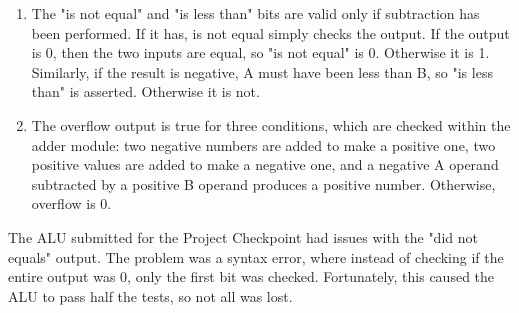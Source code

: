 \documentclass[letterpaper]{article} %
\begin{document}
\begin{enumerate}
\item The "is not equal" and "is less than" bits are valid only if subtraction has been performed. If it has, is not equal simply checks the output. If the output is 0, then the two inputs are equal, so "is not equal" is 0. Otherwise it is 1. Similarly, if the result is negative, A must have been less than B, so "is less than" is asserted. Otherwise it is not. \\
\item The overflow output is true for three conditions, which are checked within the adder module: two negative numbers are added to make a positive one, two positive values are added to make a negative one, and a negative A operand subtracted by a positive B operand produces a positive number. Otherwise, overflow is 0. \\
\end{enumerate}
The ALU submitted for the Project Checkpoint had issues with the "did not equals" output. The problem was a syntax error, where instead of checking if the entire output was 0, only the first bit was checked. Fortunately, this caused the ALU to pass half the tests, so not all was lost. \\
\newpage
\end{document}
